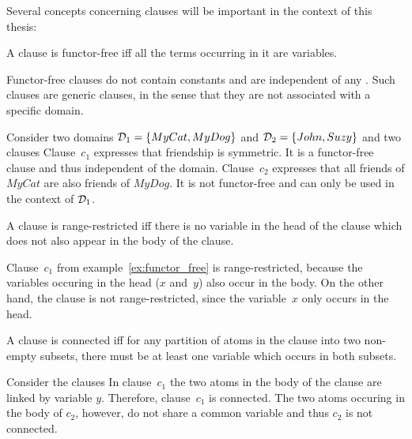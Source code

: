 Several concepts concerning clauses will be important in the context of this thesis:
\begin{definition}
\label{def:funtor_free}
A clause is functor-free iff all the terms occurring in it are variables.
\end{definition}
Functor-free clauses do not contain constants and are independent of any . Such clauses are generic clauses, in the sense that they are not associated with a specific domain.
\begin{example}
\label{ex:functor_free}
Consider two domains $\mathcal{D}_1 = \{MyCat, MyDog\}$ and $\mathcal{D}_2 = \{John, Suzy\}$ and two clauses 
Clause~$c_1$ expresses that friendship is symmetric. It is a functor-free clause and thus independent of the domain. Clause~$c_2$ expresses that all friends of $MyCat$ are also friends of $MyDog$. It is not functor-free and can only be used in the context of $\mathcal{D}_1$. 
\end{example}

\begin{definition}
\label{def:range_restricted}
A clause is range-restricted iff there is no variable in the head of the clause which does not also appear in the body of the clause.
\end{definition}

\begin{example}
Clause~$c_1$ from example~\ref{ex:functor_free} is range-restricted, because the variables occuring in the head ($x$ and~$y$) also occur in the body. On the other hand, the clause  is not range-restricted, since the variable~$x$ only occurs in the head.
\end{example}

\begin{definition}
\label{def:connected}
A clause is connected iff for any partition of atoms in the clause into two non-empty subsets, there must be at least one variable which occurs in both subsets.
\end{definition}

\begin{example}
Consider the clauses  In clause~$c_1$ the two atoms in the body of the clause are linked by variable $y$. Therefore, clause~$c_1$ is connected. The two atoms occuring in the body of $c_2$, however, do not share a common variable and thus $c_2$ is not connected.
\end{example}

